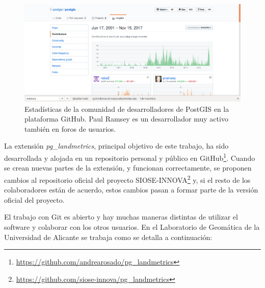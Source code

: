 \begin{figure}
\includegraphics[width=\textwidth]{Metodologia/Figs/postgis-github}
\caption{Estadísticas de la comunidad de desarrolladores de PostGIS en la plataforma GitHub. Paul Ramsey es un desarrollador muy activo también en foros de usuarios. \label{fig:postgis-github}}
\end{figure}

La extensión \textit{pg\_landmetrics}, principal objetivo de este trabajo, ha sido desarrollada y alojada en un repositorio personal y público en GitHub\footnote{\url{https://github.com/andrearosado/pg_landmetrics}}. Cuando se crean nuevas partes de la extensión, y funcionan correctamente, se proponen cambios al repositorio oficial del proyecto SIOSE-INNOVA\footnote{\url{https://github.com/siose-innova/pg_landmetrics}} y, si el resto de los colaboradores están de acuerdo, estos cambios pasan a formar parte de la versión oficial del proyecto.

El trabajo con Git es abierto y hay muchas maneras distintas de utilizar el software y colaborar con los otros usuarios. En el Laboratorio de Geomática de la Universidad de Alicante se trabaja como se detalla a continuación:

